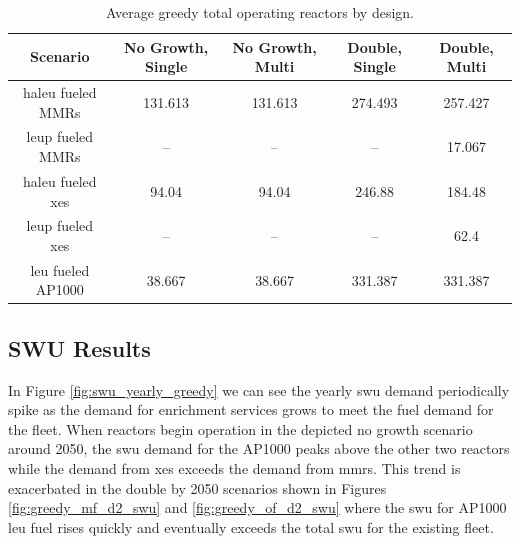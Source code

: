 \begin{table}[H]
  \centering
  \caption{Average greedy total operating reactors by design.}
  \label{tab:greedy_reac_avg}
  \begin{tabular}{c c c c c}
     \hline
     Scenario & No Growth, Single & No Growth, Multi & Double, Single & Double, Multi  \\
     \hline
     \gls{haleu} fueled MMRs      & 131.613 & 131.613 & 274.493 & 257.427 \\
     \gls{leup} fueled MMRs       & --      & --      & --      & 17.067 \\
     \gls{haleu} fueled \gls{xe}s & 94.04   & 94.04   & 246.88  & 184.48 \\
     \gls{leup} fueled \gls{xe}s  & --      & --      & --      & 62.4 \\
     \gls{leu} fueled AP1000      & 38.667  & 38.667  & 331.387 & 331.387 \\
     \hline
  \end{tabular}
\end{table}




\subsection{SWU Results}
\label{sec:greedy_swu}

In Figure \ref{fig:swu_yearly_greedy} we can see the yearly \gls{swu} demand periodically spike as the demand for enrichment services grows to meet the fuel demand for the fleet. When reactors begin operation in the depicted no growth scenario around 2050, the \gls{swu} demand for the AP1000 peaks above the other two reactors while the demand from \glspl{xe} exceeds the demand from \glspl{mmr}. This trend is exacerbated in the double by 2050 scenarios shown in Figures \ref{fig:greedy_mf_d2_swu} and \ref{fig:greedy_of_d2_swu} where the \gls{swu} for AP1000 \gls{leu} fuel rises quickly and eventually exceeds the total \gls{swu} for the existing fleet.



